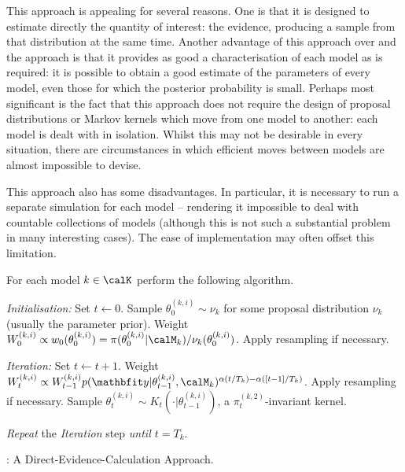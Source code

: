 
This approach is appealing for several reasons. One is that it is designed to
estimate directly the quantity of interest: the evidence, producing a sample
from that distribution at the same time. Another advantage of this approach
over \smc[1] and the \rjmcmc approach is that it provides as good a
characterisation of each model as is required: it is possible to obtain a good
estimate of the parameters of every model, even those for which the posterior
probability is small. Perhaps most significant is the fact that this approach
does not require the design of proposal distributions or Markov kernels which
move from one model to another: each model is dealt with in isolation. Whilst
this may not be desirable in every situation, there are circumstances in which
efficient moves between models are almost impossible to devise.

This approach also has some disadvantages. In particular, it is necessary to
run a separate simulation for each model -- rendering it impossible to deal
with countable collections of models (although this is not such a substantial
problem in many interesting cases). The ease of implementation may often
offset this limitation.

\begin{algorithm}
\begin{algorithmic}
  \tophrule
  \STATE For each model $k \in \calK$ perform the following algorithm.

  \STATE \emph{Initialisation:} Set $t\leftarrow0$.
  \STATE\STATESKIP Sample $\theta_0^{(k,i)}\sim\nu_k$ for some proposal
  distribution $\nu_k$ (usually the parameter prior).
  \STATE\STATESKIP Weight $W_0^{(k,i)} \propto w_0(\theta_0^{(k,i)}) =
  {\pi(\theta_0^{(k,i)}|\calM_k)}/{\nu_k(\theta_0^{(k,i)})}$.
  \STATE\STATESKIP Apply resampling if necessary.

  \STATE \emph{Iteration:} Set $t\leftarrow t + 1$.
  \STATE\STATESKIP Weight $W_t^{(k,i)} \propto W_{t-1}^{(k,i)}
  p(\data|\theta_{t-1}^{(k,i)},\calM_k)^{\alpha(t/T_k) - \alpha([t-1]/T_k)}$.
  \STATE\STATESKIP Apply resampling if necessary.
  \STATE\STATESKIP Sample $\theta_t^{(k,i)} \sim
  K_t(\cdot|\theta_{t-1}^{(k,i)})$, a $\pi_t^{(k,2)}$-invariant kernel.

  \STATE \emph{Repeat} the \emph{Iteration} step \emph{until $t = T_k$}.
  \bottomhrule
\end{algorithmic}
\caption{\smc[2]: A Direct-Evidence-Calculation Approach.}\label{alg:smc2}
\end{algorithm}

